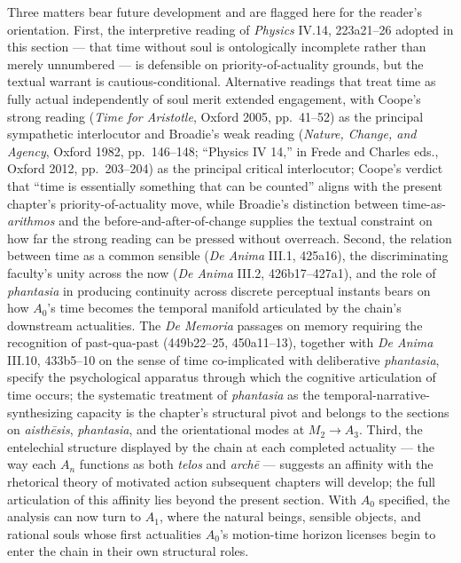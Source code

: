 Three matters bear future development and are flagged here for the reader's orientation. First, the interpretive reading of \textit{Physics} IV.14, 223a21--26 adopted in this section --- that time without soul is ontologically incomplete rather than merely unnumbered --- is defensible on priority-of-actuality grounds, but the textual warrant is cautious-conditional. Alternative readings that treat time as fully actual independently of soul merit extended engagement, with Coope's strong reading (\textit{Time for Aristotle}, Oxford 2005, pp.~41--52) as the principal sympathetic interlocutor and Broadie's weak reading (\textit{Nature, Change, and Agency}, Oxford 1982, pp.~146--148; ``Physics IV 14,'' in Frede and Charles eds., Oxford 2012, pp.~203--204) as the principal critical interlocutor; Coope's verdict that ``time is essentially something that can be counted'' aligns with the present chapter's priority-of-actuality move, while Broadie's distinction between time-as-\textit{arithmos} and the before-and-after-of-change supplies the textual constraint on how far the strong reading can be pressed without overreach. Second, the relation between time as a common sensible (\textit{De Anima} III.1, 425a16), the discriminating faculty's unity across the now (\textit{De Anima} III.2, 426b17--427a1), and the role of \textit{phantasia} in producing continuity across discrete perceptual instants bears on how $A_0$'s time becomes the temporal manifold articulated by the chain's downstream actualities. The \textit{De Memoria} passages on memory requiring the recognition of past-qua-past (449b22--25, 450a11--13), together with \textit{De Anima} III.10, 433b5--10 on the sense of time co-implicated with deliberative \textit{phantasia}, specify the psychological apparatus through which the cognitive articulation of time occurs; the systematic treatment of \textit{phantasia} as the temporal-narrative-synthesizing capacity is the chapter's structural pivot and belongs to the sections on \textit{aisthēsis}, \textit{phantasia}, and the orientational modes at $M_2 \rightarrow A_3$. Third, the entelechial structure displayed by the chain at each completed actuality --- the way each $A_n$ functions as both \textit{telos} and \textit{archē} --- suggests an affinity with the rhetorical theory of motivated action subsequent chapters will develop; the full articulation of this affinity lies beyond the present section. With $A_0$ specified, the analysis can now turn to $A_1$, where the natural beings, sensible objects, and rational souls whose first actualities $A_0$'s motion-time horizon licenses begin to enter the chain in their own structural roles.
